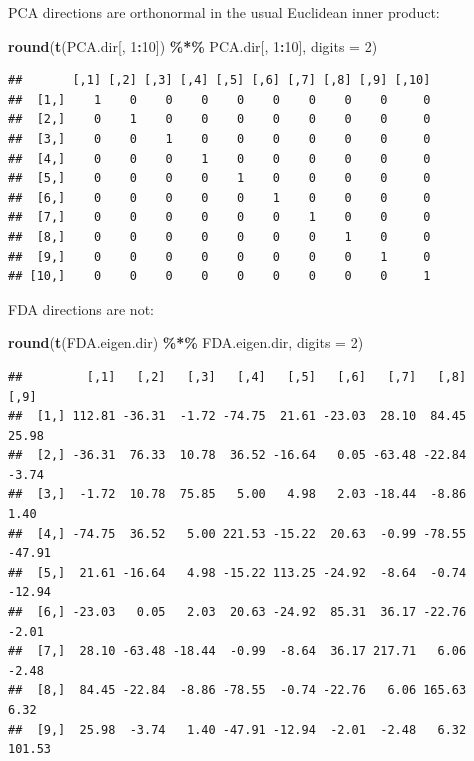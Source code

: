 \documentclass[
]{book}
\newenvironment{Shaded}{\begin{snugshade}}{\end{snugshade}}
\newcommand{\AttributeTok}[1]{\textcolor[rgb]{0.13,0.29,0.53}{#1}}
\newcommand{\DecValTok}[1]{\textcolor[rgb]{0.00,0.00,0.81}{#1}}
\newcommand{\FunctionTok}[1]{\textcolor[rgb]{0.13,0.29,0.53}{\textbf{#1}}}
\newcommand{\NormalTok}[1]{#1}
\newcommand{\SpecialCharTok}[1]{\textcolor[rgb]{0.81,0.36,0.00}{\textbf{#1}}}
\begin{document}
PCA directions are orthonormal in the usual Euclidean inner product:

\begin{Shaded}
\begin{Highlighting}[]
\FunctionTok{round}\NormalTok{(}\FunctionTok{t}\NormalTok{(PCA.dir[, }\DecValTok{1}\SpecialCharTok{:}\DecValTok{10}\NormalTok{]) }\SpecialCharTok{\%*\%}\NormalTok{ PCA.dir[, }\DecValTok{1}\SpecialCharTok{:}\DecValTok{10}\NormalTok{], }\AttributeTok{digits =} \DecValTok{2}\NormalTok{)}
\end{Highlighting}
\end{Shaded}

\begin{verbatim}
##       [,1] [,2] [,3] [,4] [,5] [,6] [,7] [,8] [,9] [,10]
##  [1,]    1    0    0    0    0    0    0    0    0     0
##  [2,]    0    1    0    0    0    0    0    0    0     0
##  [3,]    0    0    1    0    0    0    0    0    0     0
##  [4,]    0    0    0    1    0    0    0    0    0     0
##  [5,]    0    0    0    0    1    0    0    0    0     0
##  [6,]    0    0    0    0    0    1    0    0    0     0
##  [7,]    0    0    0    0    0    0    1    0    0     0
##  [8,]    0    0    0    0    0    0    0    1    0     0
##  [9,]    0    0    0    0    0    0    0    0    1     0
## [10,]    0    0    0    0    0    0    0    0    0     1
\end{verbatim}

FDA directions are not:

\begin{Shaded}
\begin{Highlighting}[]
\FunctionTok{round}\NormalTok{(}\FunctionTok{t}\NormalTok{(FDA.eigen.dir) }\SpecialCharTok{\%*\%}\NormalTok{ FDA.eigen.dir, }\AttributeTok{digits =} \DecValTok{2}\NormalTok{)}
\end{Highlighting}
\end{Shaded}

\begin{verbatim}
##         [,1]   [,2]   [,3]   [,4]   [,5]   [,6]   [,7]   [,8]   [,9]
##  [1,] 112.81 -36.31  -1.72 -74.75  21.61 -23.03  28.10  84.45  25.98
##  [2,] -36.31  76.33  10.78  36.52 -16.64   0.05 -63.48 -22.84  -3.74
##  [3,]  -1.72  10.78  75.85   5.00   4.98   2.03 -18.44  -8.86   1.40
##  [4,] -74.75  36.52   5.00 221.53 -15.22  20.63  -0.99 -78.55 -47.91
##  [5,]  21.61 -16.64   4.98 -15.22 113.25 -24.92  -8.64  -0.74 -12.94
##  [6,] -23.03   0.05   2.03  20.63 -24.92  85.31  36.17 -22.76  -2.01
##  [7,]  28.10 -63.48 -18.44  -0.99  -8.64  36.17 217.71   6.06  -2.48
##  [8,]  84.45 -22.84  -8.86 -78.55  -0.74 -22.76   6.06 165.63   6.32
##  [9,]  25.98  -3.74   1.40 -47.91 -12.94  -2.01  -2.48   6.32 101.53
\end{verbatim}
\end{document}
